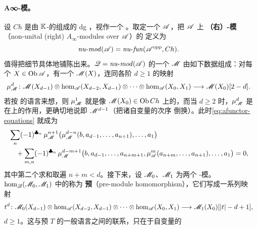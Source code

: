 \paragraph{A∞-模。}\label{sub:a-infinity-modules}
设 $Ch$ 是由 $\mathbb{K}$-\trVectorSpace{}的\trChainComplex{}组成的 dg \trCategory，视作一个%
\trACategory。取定一个\trNonunital{} \trACategory{} $\mathscr{A}$，把 $\mathscr{A}$ 上%
\textbf{\trNonunital{}（右）\trAinfty-模}（non-unital (right) $A_\infty$-modules over
$\mathscr{A}$）的%
\trNonunital{} \trACategory{}定义为
\begin{equation*}
\mathit{nu}\text{-}\mathit{mod}(\mathscr{A})=\mathit{nu}\text{-}\mathit{fun}(\mathscr{A}^{\mathrm{opp}},Ch).
\end{equation*}
值得把细节具体地铺陈出来。$\mathscr{Q}=\mathit{nu}\text{-}\mathit{mod}(\mathscr{A})$ 的一个%
\trObject{} $\mathscr{M}$ 由如下数据组成：对每个 $X\in\operatorname{Ob}\mathscr{A}$，有一个\trGraded\trVectorSpace{}%
$\mathscr{M}(X)$，连同各阶 $d\ge 1$ 的映射
\begin{equation*}
\mu^d_{\mathscr{M}}\colon\mathscr{M}(X_{d-1})\otimes\hom_{\mathscr{A}}(X_{d-2},X_{d-1})
\otimes\cdots\otimes\hom_{\mathscr{A}}(X_0,X_1)
\longrightarrow\mathscr{M}(X_0)[2-d].
\end{equation*}
若按 \trAFunctor{}的语言来想，则 $\mu^1_{\mathscr{M}}$ 就是像\trObject{}%
$\mathscr{M}(X_0)\in\operatorname{Ob} Ch$ 上的\trDifferential，而当 $d\ge 2$ 时，$\mu^d_{\mathscr{M}}$ 是%
\trFunctor{}在\trMorphism{}上的作用，更确切地说即 $\mathscr{M}^{d-1}$（把诸自变量的次序
倒换）。此时\eqref{eq:afunctor-equations} 就成为
\begin{equation}\label{eq:module-associativity-equation}
\begin{split}
&\sum_n(-1)^{\clubsuit_n}\,\mu^{n+1}_{\mathscr{M}}
\bigl(\mu^{d-n}_{\mathscr{M}}(b,a_{d-1},\ldots,a_{n+1}),\ldots,a_1\bigr)\\
&\quad+\sum_{m,n}(-1)^{\clubsuit_n}\,\mu^{d-m+1}_{\mathscr{M}}
\bigl(b,a_{d-1},\ldots,a_{n+m+1},\mu^m_{\mathscr{A}}(a_{n+m},\ldots,a_{n+1}),\ldots,a_1\bigr)=0,
\end{split}
\end{equation}
其中第二个求和取遍 $n+m<d$。接下来，设 $\mathscr{M}_0$、$\mathscr{M}_1$ 为两个%
\trNonunital{} \trAinfty-模。
$\hom_{\mathscr{Q}}(\mathscr{M}_0,\mathscr{M}_1)$ 中的\trMorphism{}称为%
\textbf{预\trModule\trHomomorphism}（pre-module homomorphism），它们写成一系列映射
\begin{equation*}
t^d\colon\mathscr{M}_0(X_{d-1})\otimes\hom_{\mathscr{A}}(X_{d-2},X_{d-1})
\otimes\cdots\otimes\hom_{\mathscr{A}}(X_0,X_1)
\longrightarrow\mathscr{M}_1(X_0)[|t|-d+1],
\end{equation*}
$d\ge 1$。这与预\trNaturalTransformation{} $T$ 的一般语言之间的联系，只在于自变量的
